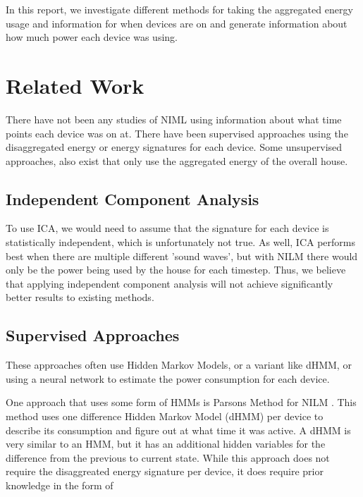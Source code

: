 \documentclass{article}
\begin{document}
In this report, we investigate different methods for taking the aggregated energy usage and information for when devices are on and generate information about how much power each device was using.



\section{Related Work}

There have not been any studies of NIML using information about what time points each device was on at.
There have been supervised approaches using the disaggregated energy\cite{} or energy signatures \cite{} for each device.
Some unsupervised approaches, also exist that only use the aggregated energy of the overall house.

\subsection{Independent Component Analysis}

To use ICA, we would need to assume that the signature for each device is statistically independent, which is unfortunately not true.
As well, ICA performs best when there are multiple different 'sound waves', but with NILM there would only be the power being used by the house for each timestep.
Thus, we believe that applying independent component analysis will not achieve significantly better results to existing methods.

\subsection{Supervised Approaches}

These approaches often use Hidden Markov Models, or a variant like dHMM, or using a neural network to estimate the power consumption for each device.

One approach that uses some form of HMMs is Parsons Method for NILM \cite{Cicchetti}.
This method uses one difference Hidden Markov Model (dHMM) per device to describe its consumption and figure out at what time it was active.
A dHMM is very similar to an HMM, but it has an additional hidden variables for the difference from the previous to current state.
While this approach does not require the disaggreated energy signature per device, it does require prior knowledge in the form of 
\end{document}
